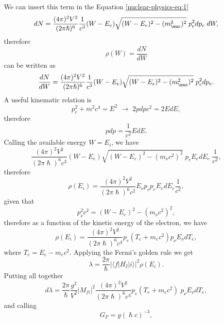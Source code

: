 We can insert this term in the Equation \ref{nuclear-physics-eq:1}
\begin{equation*}
    dN = \frac{(4\pi)^2V^2}{(2\pi\hslash)^6}\frac{1}{c^3}(W-E_e)\sqrt{(W-E_e)^2 - (m_\nuc^2)^2} \; p_e^2dp_e\; dW,
\end{equation*}
therefore
\begin{equation*}
    \rho(W) = \frac{dN}{dW}
\end{equation*}
can be written as 
\begin{equation*}
    \frac{dN}{dW} = \frac{(4\pi)^2V^2}{(2\pi\hslash)^6}\frac{1}{c^3}(W-E_e)\sqrt{(W-E_e)^2 - (m_\nuc^2)^2} \; p_e^2dp_e.
\end{equation*}
A useful kinematic relation is
\begin{equation*}
    p_e^2 + m^2c^4 = E^2\,\,\rightarrow\,\, 2pdpc^2 = 2EdE,
\end{equation*}
therefore
\begin{equation*}
    pdp = \frac{1}{c^2}EdE.
\end{equation*}
Calling the available energy $W = E_i$, we have
\begin{equation}
    \frac{(4\pi)^2V^2}{(2\pi\hslash)^6c^3}(W-E_e)\sqrt{(W-E_e)^2 - (m_{\nu}c^2)^2} \; p_e E_e dE_e \; \frac{1}{c^2},
\end{equation}
therefore
\begin{equation*}
    \rho(E_i) = \frac{(4\pi)^2V^2}{(2\pi\hslash)^6c^2} E_{\nu} p_{\nu} p_e E_e dE_e \frac{1}{c^2},
\end{equation*}
given that
\begin{equation*}
    p_\nu^2 c^2 = (W-E_e)^2 - (m_\nu c^2)^2,
\end{equation*}
therefore as a function of the kinetic energy of the electron, we have 
\begin{equation*}
    \rho (E_i) = \frac{(4\pi)^2V^2}{(2\pi\hslash)^6c^4} p_e(T_e + m_ec^2)p_\nu E_\nu dT_e,
\end{equation*}
where $T_e = E_e - m_ec^2$.
Applying the Fermi's golden rule we get
\begin{equation*}
    \lambda = \frac{2\pi}{\hslash} |\langle f | H_I | i \rangle |^2 \rho(E_i).
\end{equation*}
Putting all together 
\begin{equation*}
    d\lambda = \frac{2\pi}{\hslash}\frac{g^2}{V^2}|M_{fi}|^2 \frac{(4\pi)^2V^2}{(2\pi\hslash)^6 c^4} p_e(T_e + m_ec^2) \; p_\nu E_\nu dT_e,
\end{equation*}
and calling
\begin{equation*}
    G_F = g(\hslash c)^{-3},
\end{equation*}
